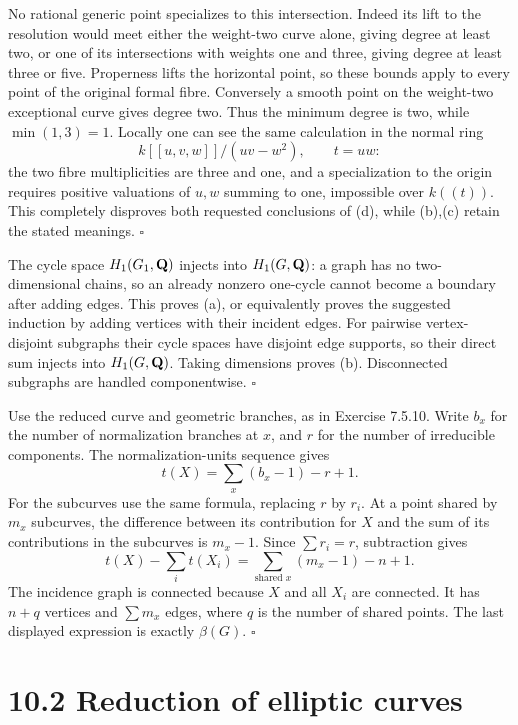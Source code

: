 \documentclass[11pt]{article}
\let\chapterexercise\exercise
\renewcommand{\exercise}[2]{\Needspace{8\baselineskip}\chapterexercise{#1}{#2}}
\begin{document}
No rational generic point specializes to this intersection. Indeed its lift to the resolution would meet either the weight-two curve alone, giving degree at least two, or one of its intersections with weights one and three, giving degree at least three or five. Properness lifts the horizontal point, so these bounds apply to every point of the original formal fibre. Conversely a smooth point on the weight-two exceptional curve gives degree two. Thus the minimum degree is two, while $\min(1,3)=1$. Locally one can see the same calculation in the normal ring
\[ k[[u,v,w]]/(uv-w^2),\qquad t=uw: \]
the two fibre multiplicities are three and one, and a specialization to the origin requires positive valuations of $u,w$ summing to one, impossible over $k((t))$. This completely disproves both requested conclusions of (d), while (b),(c) retain the stated meanings. \hfill$\square$

\pf The cycle space $H_1(G_1,\mathbf Q)$ injects into $H_1(G,\mathbf Q)$: a graph has no two-dimensional chains, so an already nonzero one-cycle cannot become a boundary after adding edges. This proves (a), or equivalently proves the suggested induction by adding vertices with their incident edges. For pairwise vertex-disjoint subgraphs their cycle spaces have disjoint edge supports, so their direct sum injects into $H_1(G,\mathbf Q)$. Taking dimensions proves (b). Disconnected subgraphs are handled componentwise. \hfill$\square$

\pf Use the reduced curve and geometric branches, as in Exercise 7.5.10. Write $b_x$ for the number of normalization branches at $x$, and $r$ for the number of irreducible components. The normalization-units sequence gives
\[ t(X)=\sum_x(b_x-1)-r+1. \]
For the subcurves use the same formula, replacing $r$ by $r_i$. At a point shared by $m_x$ subcurves, the difference between its contribution for $X$ and the sum of its contributions in the subcurves is $m_x-1$. Since $\sum r_i=r$, subtraction gives
\[ t(X)-\sum_i t(X_i)=\sum_{\text{shared }x}(m_x-1)-n+1. \]
The incidence graph is connected because $X$ and all $X_i$ are connected. It has $n+q$ vertices and $\sum m_x$ edges, where $q$ is the number of shared points. The last displayed expression is exactly $\beta(G)$. \hfill$\square$

\section*{10.2 Reduction of elliptic curves}
\end{document}
